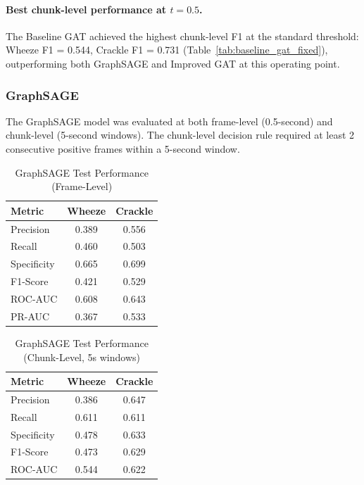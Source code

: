 \paragraph{Best chunk-level performance at $t=0.5$.}
The Baseline GAT achieved the highest chunk-level F1 at the standard threshold:
Wheeze F1 = 0.544, Crackle F1 = 0.731 (Table~\ref{tab:baseline_gat_fixed}),
outperforming both GraphSAGE and Improved GAT at this operating point.

\subsubsection{GraphSAGE}

The GraphSAGE model was evaluated at both frame-level (0.5-second) and
chunk-level (5-second windows). The chunk-level decision rule required at
least 2 consecutive positive frames within a 5-second window.

\begin{table}[!h]
  \renewcommand{\arraystretch}{1.15}
  \caption{GraphSAGE Test Performance (Frame-Level)}
  \label{tab:graphsage_frame}
  \centering
  \begin{tabular}{@{}lcc@{}}
    \toprule
    \textbf{Metric} & \textbf{Wheeze} & \textbf{Crackle} \\
    \midrule
    Precision        & 0.389 & 0.556 \\
    Recall           & 0.460 & 0.503 \\
    Specificity      & 0.665 & 0.699 \\
    F1-Score         & 0.421 & 0.529 \\
    ROC-AUC          & 0.608 & 0.643 \\
    PR-AUC           & 0.367 & 0.533 \\
    \bottomrule
  \end{tabular}
\end{table}

\begin{table}[!h]
  \renewcommand{\arraystretch}{1.15}
  \caption{GraphSAGE Test Performance (Chunk-Level, 5s windows)}
  \label{tab:graphsage_chunk}
  \centering
  \begin{tabular}{@{}lcc@{}}
    \toprule
    \textbf{Metric} & \textbf{Wheeze} & \textbf{Crackle} \\
    \midrule
    Precision        & 0.386 & 0.647 \\
    Recall           & 0.611 & 0.611 \\
    Specificity      & 0.478 & 0.633 \\
    F1-Score         & 0.473 & 0.629 \\
    ROC-AUC          & 0.544 & 0.622 \\
    \bottomrule
  \end{tabular}
\end{table}

